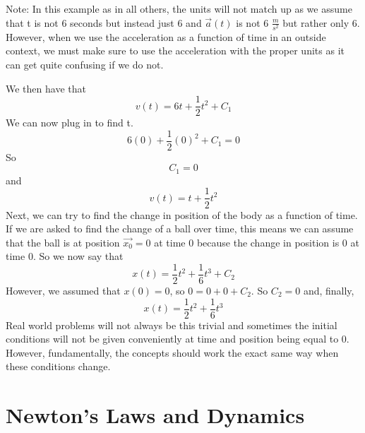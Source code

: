 \documentclass{article}[gray]
\numberwithin{equation}{subsection}
\begin{document}
Note: In this example as in all others, the units will not match up as we assume that t is not 6 seconds but instead just 6 and $\vec{a}\left(t\right)$ is not 6 $\frac{m}{s^2}$ but rather only 6. However, when we use the acceleration as a function of time in an outside context, we must make sure to use the acceleration with the proper units as it can get quite confusing if we do not. 

We then have that \begin{equation}v\left(t\right)=6t+\frac{1}{2}t^2+C_1\end{equation} We can now plug in to find t. \begin{equation}6\left(0\right)+\frac{1}{2}\left(0\right)^2+C_1=0\end{equation} So $$C_1 = 0$$ and \begin{equation}v\left(t\right)=t+\frac{1}{2}t^2\end{equation} Next, we can try to find the change in position of the body as a function of time. If we are asked to find the change of a ball over time, this means we can assume that the ball is at position $\vec{x_0} = 0$ at time 0 because the change in position is 0 at time 0. So we now say that \begin{equation}x\left(t\right)=\frac{1}{2}t^2+\frac{1}{6}t^3+C_2\end{equation} However, we assumed that $x\left(0\right)=0$, so $0=0+0+C_2$. So $C_2=0$ and, finally, \begin{equation}x\left(t\right)=\frac{1}{2}t^2+\frac{1}{6}t^3\end{equation} Real world problems will not always be this trivial and sometimes the initial conditions will not be given conveniently at time and position being equal to 0. However, fundamentally, the concepts should work the exact same way when these conditions change.
\newline
\newline
{}
\clearpage
\section{Newton's Laws and Dynamics}
\end{document}
